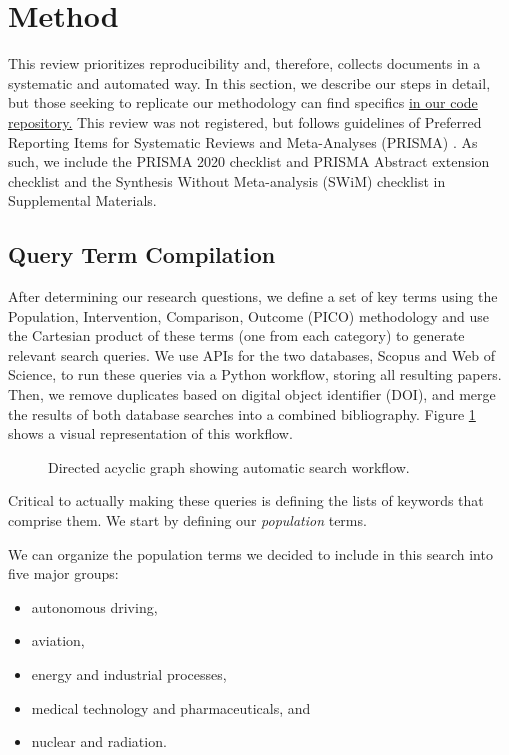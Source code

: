 \documentclass[authoryear,preprint,12pt]{elsarticle}
\begin{document}
\section{Method}
\label{sec:method}
This review prioritizes reproducibility and, therefore, collects documents in a
systematic and automated way. In this section, we describe our steps in detail, but those seeking to replicate our methodology can find specifics \href{https://github.com/aims-umich/2025-panczyk-slr}{in our code repository.} This review was not registered, but follows guidelines of Preferred Reporting Items for Systematic Reviews and Meta-Analyses (PRISMA) \cite{pagePRISMA2020Statement2021}. As such, we include the PRISMA 2020 checklist and PRISMA Abstract extension checklist \cite{pagePRISMA2020Statement2021} and the Synthesis Without Meta-analysis (SWiM) checklist \cite{campbellSynthesisMetaanalysisSWiM2020} in Supplemental Materials.

\subsection{Query Term Compilation}
After determining our research questions, we define a set of key terms using the
Population, Intervention, Comparison, Outcome (PICO) methodology
\cite{schardtUtilizationPICOFramework2007} and use the Cartesian product of
these terms (one from each category) to generate relevant search queries. We use
APIs for the two databases, Scopus and Web of Science, to run these queries via
a Python workflow, storing all resulting papers. Then, we remove duplicates
based on digital object identifier (DOI), and merge the results of both database
searches into a combined bibliography. Figure \ref{fig:workflow} shows a visual
representation of this workflow. 

\begin{figure}
    \centering
    \resizebox{0.8\textwidth}{!}{}
    \caption{Directed acyclic graph showing automatic search workflow.}
    \label{fig:workflow}
\end{figure}

Critical to actually making these queries is defining the lists of keywords that
comprise them. We start by defining our \textit{population} terms.  

We can organize the population terms we decided to include in this search into
five major groups: 
\begin{itemize}
    \item autonomous driving,
    \item aviation,
    \item energy and industrial processes,
    \item medical technology and pharmaceuticals, and
    \item nuclear and radiation.
\end{itemize}
\end{document}
